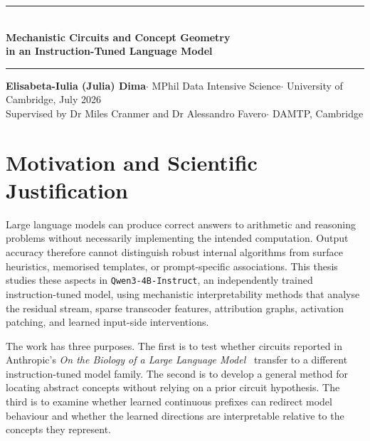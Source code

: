 \documentclass[11pt,a4paper]{article}
\begin{document}
\thispagestyle{fancy}

\noindent
{\color{rulecol}\rule{\linewidth}{1.8pt}}\\[4pt]
{\LARGE\bfseries Mechanistic Circuits and Concept Geometry\\[2pt]
in an Instruction-Tuned Language Model}\\[6pt]
{\color{rulecol}\rule{\linewidth}{0.5pt}}

\vspace{8pt}
\noindent
{\footnotesize
\textbf{Elisabeta-Iulia (Julia) Dima}\enspace$\cdot$\enspace
MPhil Data Intensive Science\enspace$\cdot$\enspace
University of Cambridge, July 2026
}\\[2pt]
\noindent
{\scriptsize\color{subtlegray}
Supervised by Dr Miles Cranmer and Dr Alessandro Favero\enspace$\cdot$\enspace
DAMTP, Cambridge
}

\vspace{14pt}

\section{Motivation and Scientific Justification}

Large language models can produce correct answers to arithmetic and reasoning
problems without necessarily implementing the intended computation. Output
accuracy therefore cannot distinguish robust internal algorithms from surface
heuristics, memorised templates, or prompt-specific associations. This thesis
studies these aspects in \texttt{Qwen3-4B-Instruct}, an independently trained
instruction-tuned model, using mechanistic interpretability methods that analyse
the residual stream, sparse transcoder features, attribution graphs, activation
patching, and learned input-side interventions.

The work has three purposes. The first is to test whether circuits reported in
Anthropic's \textit{On the Biology of a Large Language Model}~\cite{lindsey2025biology}
transfer to a different instruction-tuned model family. The second is to develop
a general method for locating abstract concepts without relying on a prior
circuit hypothesis. The third is to examine whether learned continuous prefixes
can redirect model behaviour and whether the learned directions are
interpretable relative to the concepts they represent.
\end{document}
